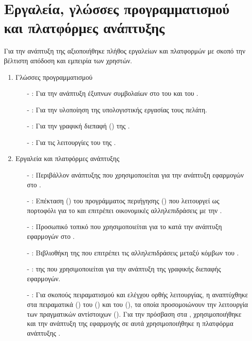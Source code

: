 \section{Εργαλεία, γλώσσες προγραμματισμού και πλατφόρμες ανάπτυξης}
Για την ανάπτυξη της  αξιοποιήθηκε πλήθος εργαλείων και πλατφορμών με σκοπό την βέλτιστη απόδοση και εμπειρία των χρηστών.

\begin{enumerate}
    \item Γλώσσες προγραμματισμού
    \begin{itemize}
        \item[-] : Για την ανάπτυξη έξυπνων συμβολαίων στο  του  και του . 
        \item[-] : Για την υλοποίηση της υπολογιστικής εργασίας τους πελάτη.
        \item[-] : Για την γραφική διεπαφή () της .
        \item[-] : Για τις λειτουργίες του  της .
    \end{itemize}
    \item Εργαλεία και πλατφόρμες ανάπτυξης
    \begin{itemize}
        \item[-] : Περιβάλλον ανάπτυξης που χρησιμοποιείται για την ανάπτυξη εφαρμογών στο  \cite{ref44}.
        \item[-] : Επέκταση () του προγράμματος περιήγησης () που λειτουργεί ως πορτοφόλι για το  και επιτρέπει οικονομικές αλληλεπιδράσεις με την  \cite{ref43}.
        \item[-] : Προσωπικό τοπικό  που χρησιμοποιείται για το  κατά την ανάπτυξη εφαρμογών στο .
        \item[-] : Βιβλιοθήκη της  που επιτρέπει τις αλληλεπιδράσεις μεταξύ κόμβων του .
        \item[-] :  της  που χρησιμοποιείται για την ανάπτυξη της γραφικής διεπαφής εφαρμογών.
        \item[-] : Για σκοπούς πειραματισμού και ελέγχου ορθής λειτουργίας, η  αναπτύχθηκε στα πειραματικά  () του  () και του  (), τα οποία προσομοιώνουν την λειτουργία των πραγματικών αντίστοιχων  (). Για την πρόσβαση στα , χρησιμοποιήθηκε και την ανάπτυξη της εφαρμογής σε αυτά χρησιμοποιήθηκε η πλατφόρμα ανάπτυξης  \cite{ref52,ref53,ref54}. 
    \end{itemize}
\end{enumerate}


